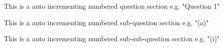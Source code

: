 \documentclass{utad_msc}
\date{January 20, 2011}
\begin{document}
\titlepage

\tableofcontents    %
\newpage

\question

This is a auto incrementing numbered question section e.g. "Question 1" 

This is a auto incrementing numbered sub-question section e.g. "(a)" 

This is a auto incrementing numbered sub-sub-question section e.g. "(i)" 
\end{document}
